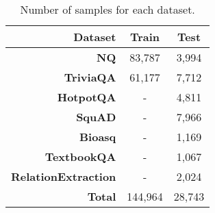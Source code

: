 \begin{table}[tp]
\centering
\begin{tabular}{@{}r|cc@{}}
\toprule
\textbf{Dataset}            & \textbf{Train} & \textbf{Test} \\ \midrule
\textbf{NQ}                 & 83,787          & 3,994          \\
\textbf{TriviaQA}           & 61,177          & 7,712          \\
\textbf{HotpotQA}           & -              & 4,811          \\
\textbf{SquAD}              & -              & 7,966          \\
\textbf{Bioasq}             & -              & 1,169          \\
\textbf{TextbookQA}         & -              & 1,067          \\
\textbf{RelationExtraction} & -              & 2,024          \\
\midrule
\textbf{Total}              & 144,964         & 28,743         \\ \bottomrule
\end{tabular}
\caption{Number of samples for each dataset.}
\label{table:dataset_stat}
\end{table}